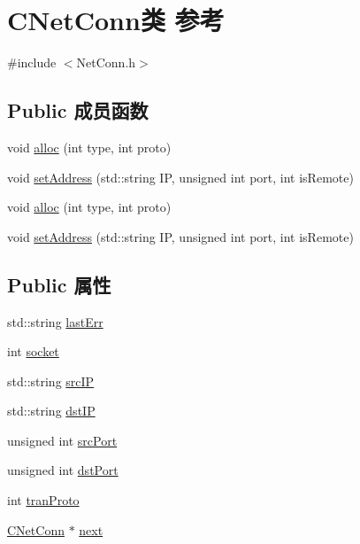 \hypertarget{class_c_net_conn}{}\section{C\+Net\+Conn类 参考}
\label{class_c_net_conn}


{\ttfamily \#include $<$Net\+Conn.\+h$>$}

\subsection*{Public 成员函数}
\begin{DoxyCompactItemize}
\item 
void \hyperlink{class_c_net_conn_acbae5bdb550ed916cfaedf6ec0caa8de}{alloc} (int type, int proto)
\item 
void \hyperlink{class_c_net_conn_a9157b83f4f5d149487dadba775e53fa3}{set\+Address} (std\+::string IP, unsigned int port, int is\+Remote)
\item 
void \hyperlink{class_c_net_conn_acbae5bdb550ed916cfaedf6ec0caa8de}{alloc} (int type, int proto)
\item 
void \hyperlink{class_c_net_conn_a9157b83f4f5d149487dadba775e53fa3}{set\+Address} (std\+::string IP, unsigned int port, int is\+Remote)
\end{DoxyCompactItemize}
\subsection*{Public 属性}
\begin{DoxyCompactItemize}
\item 
std\+::string \hyperlink{class_c_net_conn_af403a1097dad68c834126c515fa76893}{last\+Err}
\item 
int \hyperlink{class_c_net_conn_a622ed64d7d62629e8ac33b1d2d0c70bc}{socket}
\item 
std\+::string \hyperlink{class_c_net_conn_ab811fe46f1f54064735438c119df692e}{src\+IP}
\item 
std\+::string \hyperlink{class_c_net_conn_a29e8c336b1ebcdec3d1867d2c8667d88}{dst\+IP}
\item 
unsigned int \hyperlink{class_c_net_conn_a01763de4d43bf8f45022ad549141ec2b}{src\+Port}
\item 
unsigned int \hyperlink{class_c_net_conn_a3ba6e293a471292e135c20706d388b9c}{dst\+Port}
\item 
int \hyperlink{class_c_net_conn_a887c118d2000cf8bd230a8f09579b7b7}{tran\+Proto}
\item 
\hyperlink{class_c_net_conn}{C\+Net\+Conn} $\ast$ \hyperlink{class_c_net_conn_af2958082fddd86589edf11785ccc8231}{next}
\end{DoxyCompactItemize}
